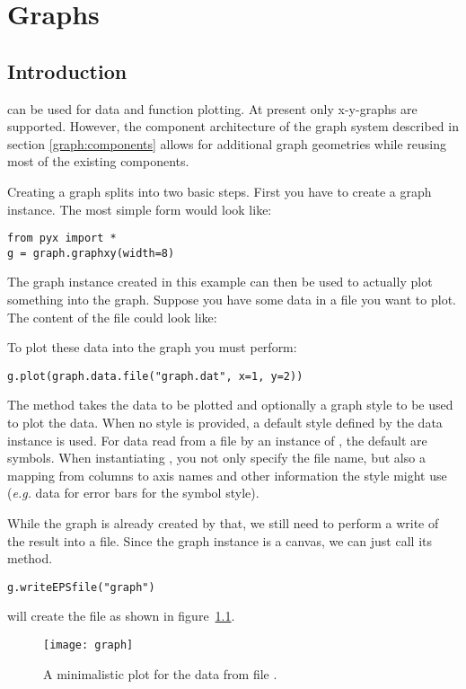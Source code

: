 \chapter{Graphs\label{graph}}
\section{Introduction}
\PyX{} can be used for data and function plotting. At present only
x-y-graphs are supported. However, the component architecture of the
graph system described in section \ref{graph:components} allows for
additional graph geometries while reusing most of the existing
components.

Creating a graph splits into two basic steps. First you have to create
a graph instance. The most simple form would look like:
\begin{verbatim}
from pyx import *
g = graph.graphxy(width=8)
\end{verbatim}
The graph instance  created in this example can then be used
to actually plot something into the graph. Suppose you have some data
in a file  you want to plot. The content of the file
could look like:

To plot these data into the graph  you must perform:
\begin{verbatim}
g.plot(graph.data.file("graph.dat", x=1, y=2))
\end{verbatim}
The method  takes the data to be plotted and optionally
a graph style to be used to plot the data. When no style is provided,
a default style defined by the data instance is used. For data read
from a file by an instance of , the default are
symbols. When instantiating , you not only
specify the file name, but also a mapping from columns to axis names
and other information the style might use (\emph{e.g.} data for error
bars for the symbol style).

While the graph is already created by that, we still need to perform a
write of the result into a file. Since the graph instance is a canvas,
we can just call its  method.
\begin{verbatim}
g.writeEPSfile("graph")
\end{verbatim}
will create the file  as shown in
figure~\ref{fig:graph}.

\begin{figure}[ht]
\centerline{\texttt{[image: graph]}}
\caption{A minimalistic plot for the data from file .}
\label{fig:graph}
\end{figure}

